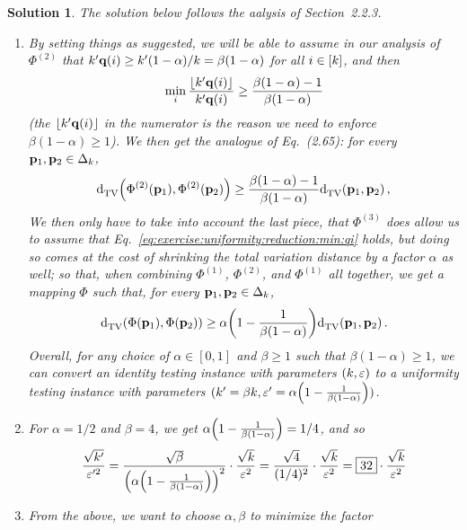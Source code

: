 \documentclass[biber]{nowfnt} %
\newtheorem{solution}{Solution}[chapter]
\begin{document}
\begin{solution} The solution below follows the aalysis of Section~2.2.3.
\begin{enumerate}
  \item By setting things as suggested, we will be able to assume in our analysis of $\Phi^{(2)}$ that $k'\mathbf{q}(i) \geq k'(1-\alpha)/k = \beta(1-\alpha)$ for all $i\in[k]$, and then
  \begin{equation}
  	\label{eq:exercise:uniformity:reduction:min:qi}
  	\min_i \frac{\flr{\ab'\q(i)}}{\ab'\q(i)} \geq \frac{\beta(1-\alpha)-1}{\beta(1-\alpha)}
  \end{equation}
  (the $\flr{\ab'\q(i)}$ in the numerator is the reason we need to enforce $\beta(1-\alpha)\geq 1$). We then get the analogue of Eq.~(2.65): for every $\mathbf{p}_1,\mathbf{p}_2\in\Delta_{k}$, 
  \begin{equation}
  			\totalvardist{\Phi^{(2)}(\p_1)}{\Phi^{(2)}(\p_2)} \geq \frac{\beta(1-\alpha)-1}{\beta(1-\alpha)}\totalvardist{\p_1}{\p_2}\,,
  \end{equation}
  We then only have to take into account the last piece, \ie that $\Phi^{(3)}$ does allow us to assume that Eq.~\eqref{eq:exercise:uniformity:reduction:min:qi} holds, but doing so comes at the cost of shrinking the total variation distance by a factor $\alpha$ as well; so that, when combining $\Phi^{(1)}$, $\Phi^{(2)}$, and $\Phi^{(1)}$ all together, we get a mapping $\Phi$ such that, for every $\mathbf{p}_1,\mathbf{p}_2\in\Delta_{k}$, 
  \begin{equation}
  			\totalvardist{\Phi(\p_1)}{\Phi(\p_2)} \geq \alpha\Paren{1-\frac{1}{\beta(1-\alpha)}}\totalvardist{\p_1}{\p_2}\,.
  \end{equation}
  Overall, for any choice of $\alpha\in[0,1]$ and $\beta \geq 1$ such that $\beta(1-\alpha) \geq 1$, we can convert an identity testing instance with parameters $(k,\varepsilon)$ to a uniformity testing instance with parameters $(\ab' = \beta\ab, \dst' = \alpha\Paren{1-\frac{1}{\beta(1-\alpha)}})$.
  \item For $\alpha = 1/2$ and $\beta=4$, we get $\alpha\Paren{1-\frac{1}{\beta(1-\alpha)}} = 1/4$, and so
  \[
  	\frac{\sqrt{\ab'}}{\dst'^2} 
  	= \frac{\sqrt{\beta}}{\Paren{\alpha\Paren{1-\frac{1}{\beta(1-\alpha)}}}^2}\cdot \frac{\sqrt{\ab}}{\dst^2}  
  	= \frac{\sqrt{4}}{(1/4)^2}\cdot \frac{\sqrt{\ab}}{\dst^2} 
  	= \boxed{32}\cdot \frac{\sqrt{\ab}}{\dst^2}
  \]
  \item From the above, we want to choose $\alpha, \beta$ to minimize the factor
  \begin{equation}

\end{equation}
\end{enumerate}
\end{solution}
\end{document}
